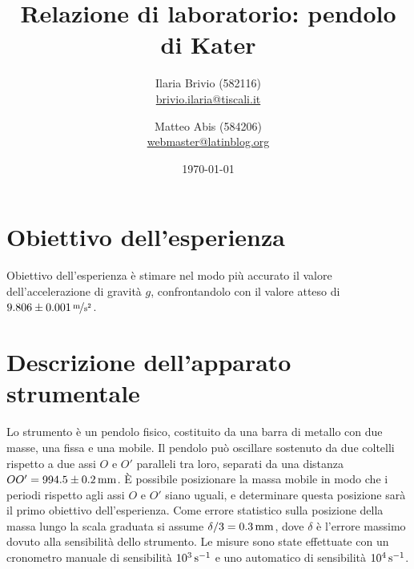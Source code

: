 \documentclass[italian,a4paper]{article}
\begin{document}
\title{Relazione di laboratorio: pendolo di Kater}
\author{\normalsize Ilaria Brivio (582116)\\%
\normalsize \url{brivio.ilaria@tiscali.it}%
\and %
\normalsize Matteo Abis (584206)\\ %
\normalsize \url{webmaster@latinblog.org}}
\date{\today}
\maketitle
\section{Obiettivo dell'esperienza}
Obiettivo dell'esperienza è stimare nel modo più accurato il valore dell'accelerazione di gravità $g$, confrontandolo con il valore atteso di $\unitfrac[9.806\pm 0.001]{m}{s^2}$.
\section{Descrizione dell'apparato strumentale}
Lo strumento è un pendolo fisico, costituito da una barra di metallo con due masse, una fissa e una mobile. Il pendolo può oscillare sostenuto da due coltelli rispetto a due assi $O$ e $O'$ paralleli tra loro, separati da una distanza $OO'=\unit[994.5\pm0.2]{mm}$. \`E possibile posizionare la massa mobile in modo che i periodi rispetto agli assi $O$ e $O'$ siano uguali, e determinare questa posizione sarà il primo obiettivo dell'esperienza. Come errore statistico sulla posizione della massa lungo la scala graduata si assume $\delta/3 = \unit[0.3]{mm}$, dove $\delta$ è l'errore massimo dovuto alla sensibilità dello strumento. Le misure sono state effettuate con un cronometro manuale di sensibilità $\unit[10^3]{s^{-1}}$ e uno automatico di sensibilità $\unit[10^4]{s^{-1}}$.
\end{document}
